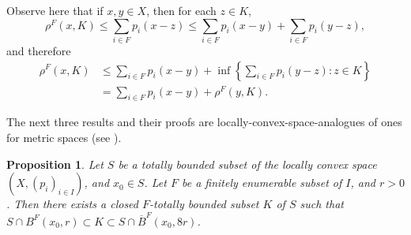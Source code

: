 \documentclass{article}%
\newtheorem{proposition}[theorem]{Proposition}
\begin{document}
Observe here that if $x,y\in X$, then for each $z\in K$,%
\[
\rho^{F}(x,K)\leq\sum_{i\in F}p_{i}(x-z)\leq\sum_{i\in F}p_{i}(x-y)+\sum_{i\in
F}p_{i}(y-z),
\]
and therefore%
\begin{align*}
\rho^{F}(x,K)  &  \leq\sum_{i\in F}p_{i}(x-y)+\inf\left\{  \sum_{i\in F}%
p_{i}(y-z):z\in K\right\} \\
&  =\sum_{i\in F}p_{i}(x-y)+\rho^{F}(y,K).
\end{align*}


The next three results and their proofs are locally-convex-space-analogues of
ones for metric spaces (see \cite[pages 42--44]{BVtech}).

\begin{proposition}
\label{p11}Let $S$ be a totally bounded subset of the locally convex space
$\left(  X,\left(  p_{i}\right)  _{i\in I}\right)  $, and $x_{0}\in S$. Let
$F$ be a finitely enumerable subset of $I$, and $r>0$. Then there exists a
closed $F$-totally bounded subset $K$ of $S$ such that $S\cap B^{F}%
(x_{0},r)\subset K\subset S\cap\overline{B}^{F}(x_{0},8r)$.
\end{proposition}
\end{document}
